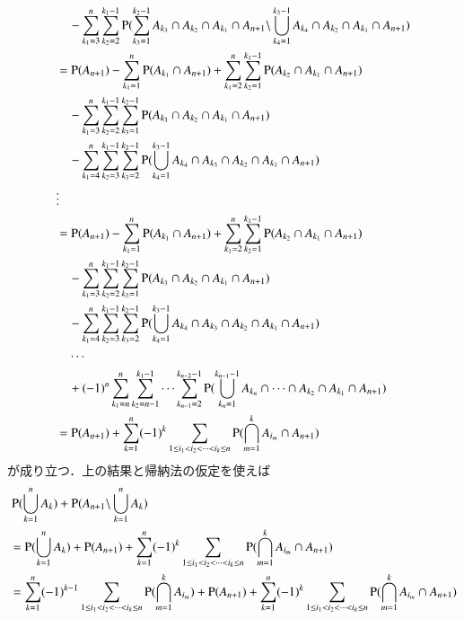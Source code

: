 \begin{description}
\begin{description}
\begin{align}
					&\quad- \sum_{k_1=3}^{n} \sum_{k_2=2}^{k_1 - 1} \operatorname{P} (\sum_{k_3=1}^{k_2 - 1} A_{k_3} \cap A_{k_2} \cap A_{k_1} \cap A_{n+1} \backslash \bigcup_{k_4 = 1}^{k_3 - 1} A_{k_4} \cap A_{k_2} \cap A_{k_1} \cap A_{n+1}) \\
				&= \operatorname{P} (A_{n+1}) - \sum_{k_1=1}^{n} \operatorname{P} (A_{k_1} \cap A_{n+1}) + \sum_{k_1=2}^{n} \sum_{k_2=1}^{k_1 - 1} \operatorname{P} (A_{k_2} \cap A_{k_1} \cap A_{n+1}) \\
					&\quad- \sum_{k_1=3}^{n} \sum_{k_2=2}^{k_1 - 1} \sum_{k_3=1}^{k_2 - 1} \operatorname{P} ( A_{k_3} \cap A_{k_2} \cap A_{k_1} \cap A_{n+1}) \\
					&\quad- \sum_{k_1=4}^{n} \sum_{k_2=3}^{k_1 - 1} \sum_{k_3=2}^{k_2 - 1} \operatorname{P} (\bigcup_{k_4 = 1}^{k_3 - 1} A_{k_4} \cap A_{k_3} \cap A_{k_2} \cap A_{k_1} \cap A_{n+1}) \\
				& \vdots \\
				&= \operatorname{P} (A_{n+1}) - \sum_{k_1=1}^{n} \operatorname{P} (A_{k_1} \cap A_{n+1}) + \sum_{k_1=2}^{n} \sum_{k_2=1}^{k_1 - 1} \operatorname{P} (A_{k_2} \cap A_{k_1} \cap A_{n+1}) \\
					&\quad- \sum_{k_1=3}^{n} \sum_{k_2=2}^{k_1 - 1} \sum_{k_3=1}^{k_2 - 1} \operatorname{P} ( A_{k_3} \cap A_{k_2} \cap A_{k_1} \cap A_{n+1}) \\
					&\quad- \sum_{k_1=4}^{n} \sum_{k_2=3}^{k_1 - 1} \sum_{k_3=2}^{k_2 - 1} \operatorname{P} (\bigcup_{k_4 = 1}^{k_3 - 1} A_{k_4} \cap A_{k_3} \cap A_{k_2} \cap A_{k_1} \cap A_{n+1}) \\
					&\quad\cdots \\
					&\quad +(-1)^n  \sum_{k_1=n}^{n} \sum_{k_2=n-1}^{k_1 - 1} \cdots \sum_{k_{n-1} = 2}^{k_{n-2}-1} \operatorname{P} (\bigcup_{k_n = 1}^{k_{n-1} - 1} A_{k_{n}} \cap \cdots \cap A_{k_2} \cap A_{k_1} \cap A_{n+1}) \\
				&= \operatorname{P} (A_{n+1}) + \sum_{k=1}^{n}(-1)^k \sum_{1 \leq i_1 < i_2 < \cdots < i_k \leq n} \operatorname{P} (\bigcap_{m=1}^{k}A_{i_m} \cap A_{n+1})
			\end{align}
			が成り立つ．上の結果と帰納法の仮定を使えば
			\begin{align}
				&\prob{\bigcup_{k=1}^{n} A_k} + \prob{A_{n+1} \backslash \bigcup_{k=1}^{n}A_k} \\
				&= \prob{\bigcup_{k=1}^{n} A_k} + \prob{A_{n+1}} + \sum_{k=1}^{n}(-1)^k \sum_{1 \leq i_1 < i_2 < \cdots < i_k \leq n} \prob{\bigcap_{m=1}^{k}A_{i_m} \cap A_{n+1}} \\
				&= \sum_{k=1}^{n}(-1)^{k-1} \sum_{1 \leq i_1 < i_2 < \cdots < i_k \leq n} \prob{\bigcap_{m=1}^{k}A_{i_m}} + \prob{A_{n+1}} + \sum_{k=1}^{n}(-1)^k \sum_{1 \leq i_1 < i_2 < \cdots < i_k \leq n} \prob{\bigcap_{m=1}^{k}A_{i_m} \cap A_{n+1}} \\

\end{align}
\end{description}
\end{description}
